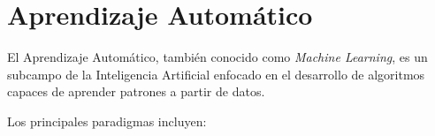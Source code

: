 \section{Aprendizaje Automático}

El Aprendizaje Automático, también conocido como \textit{Machine Learning}, es un subcampo de la
Inteligencia Artificial enfocado en el desarrollo de algoritmos capaces de aprender patrones a
partir de datos.

Los principales paradigmas incluyen: 